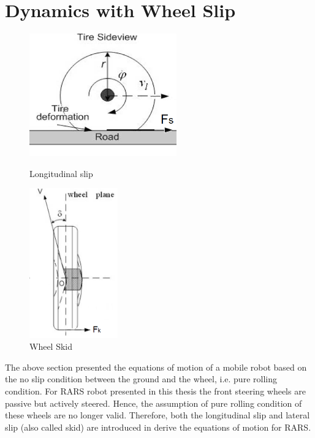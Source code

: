 {\section{Dynamics with Wheel Slip}
\begin{figure}
		\begin{minipage}[t]{0.5\textwidth}
		\centering
		\includegraphics[width=2.5in]{Chapter3/fig/Slip} 
		\caption{Longitudinal slip \cite{wang2008modeling}}\label{fig:slip}
	\end{minipage}
	\hfill
	\begin{minipage}[t]{0.5\textwidth}
		\centering
		\includegraphics[width=1.5in]{Chapter3/fig/Skid} 
		\caption{Wheel Skid \cite{wang2008modeling}}\label{fig:skid}
	\end{minipage}
\end{figure}
The above section presented  the equations of motion  of a mobile robot  based on the no slip condition between the ground and the wheel, i.e. pure rolling condition. For RARS robot presented in this thesis the front steering wheels  are passive  but actively steered. Hence, the assumption of pure rolling condition of these wheels are no longer valid. Therefore, both the longitudinal slip and lateral slip (also called skid) are introduced in derive the equations of motion for RARS.
}
